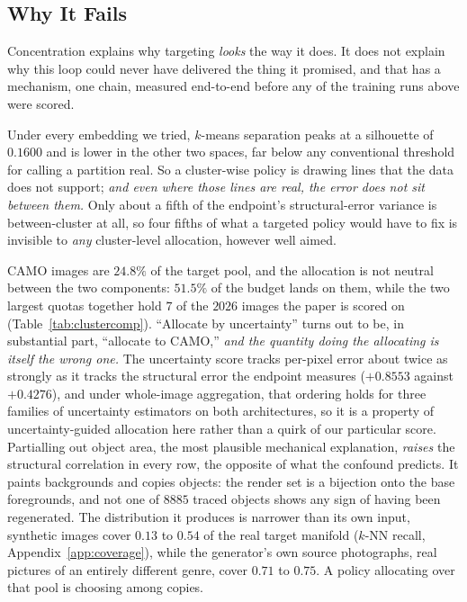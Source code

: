 \documentclass{article}
\begin{document}
\subsection{Why It Fails}
\label{sec:why}
Concentration explains why targeting \emph{looks} the way it does. It does not explain why this loop
could never have delivered the thing it promised, and that has a mechanism, one chain, measured end-to-end before any of the training runs above were scored.

Under every embedding we tried, $k$-means separation peaks at a
silhouette of $0.1600$ and is lower in the other two spaces, far below any conventional threshold
for calling a partition real. So a cluster-wise policy is drawing lines that the data does not
support; \textit{and even where those lines are real, the error does not sit between them.} Only
about a fifth of the endpoint's structural-error variance is between-cluster at all, so four fifths
of what a targeted policy would have to fix is invisible to \emph{any} cluster-level allocation,
however well aimed.

CAMO images are $24.8\%$ of the target pool, and the allocation is not neutral between the two components: $51.5\%$
of the budget lands on them, while the two largest quotas together hold $7$ of the $2026$ images the
paper is scored on (Table~\ref{tab:clustercomp}). ``Allocate by uncertainty'' turns out to be, in substantial part, ``allocate
to CAMO,'' \textit{and the quantity doing the allocating is itself the wrong one.} The
uncertainty score tracks per-pixel error about twice as strongly as it tracks the structural error
the endpoint measures ($+0.8553$ against $+0.4276$), and under whole-image aggregation, that ordering
holds for three families of uncertainty estimators on both architectures, so it is a property of uncertainty-guided allocation
here rather than a quirk of our particular score. Partialling out object area, the most plausible
mechanical explanation, \emph{raises} the structural correlation in every row, the opposite of what the confound predicts. It paints backgrounds and copies objects: the render set is a bijection onto the base foregrounds, and not one
of $8885$ traced objects shows any sign of having been regenerated. The distribution it produces is
narrower than its own input, synthetic images cover $0.13$ to $0.54$ of the real target manifold
($k$-NN recall, Appendix~\ref{app:coverage}), while the generator's own source photographs, real
pictures of an entirely different genre, cover $0.71$ to $0.75$. A policy allocating over that pool is choosing among copies.
\end{document}
